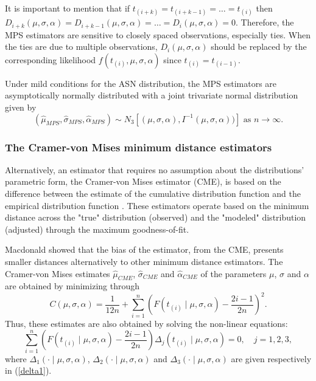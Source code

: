 \documentclass[]{interact}
\theoremstyle{plain}%
\theoremstyle{definition}
\theoremstyle{remark}
\begin{document}
It is important to mention that if $t_{(i+k)}=t_{(i+k-1)}=\ldots=t_{(i)}$ then $D_{i+k}(\mu,\sigma,\alpha)=D_{i+k-1}(\mu,\sigma,\alpha)=\ldots=D_{i}(\mu,\sigma,\alpha)=0$. Therefore, the MPS estimators are sensitive to closely spaced observations, especially ties. When the ties are due to multiple observations, $D_{i}(\mu,\sigma,\alpha)$ should be replaced by the corresponding likelihood $f(t_{(i)},\mu,\sigma,\alpha)$ since $t_{(i)}=t_{(i-1)}$. 

Under mild conditions for the ASN distribution, the MPS estimators are asymptotically normally distributed with a joint trivariate normal distribution given by
\begin{equation*}
(\hat{\mu}_{MPS},\hat{\sigma}_{MPS},\hat{\alpha}_{MPS})\sim N_3\left[(\mu,\sigma,\alpha),I^{-1}(\mu,\sigma,\alpha))\right] \mbox{ as } n \to \infty .
\end{equation*}


\subsubsection{The Cramer-von Mises minimum distance estimators}

Alternatively, an estimator that requires no assumption about the distributions' parametric form, the Cramer-von Mises estimator (CME), is based on the difference between the estimate of the cumulative distribution function and the empirical distribution
function \cite{cramer1928composition, von1928statistik}. These estimators operate based on the minimum distance across the "true" distribution (observed) and the "modeled" distribution (adjusted) through the maximum goodness-of-fit.

Macdonald \cite{macdonald1971estimation} showed that the bias of the estimator, from the CME, presents smaller distances alternatively to other minimum distance estimators. The Cramer-von Mises estimates $\hat{\mu}_{CME}$, $\hat{\sigma}_{CME}$ and $\hat{\alpha}_{CME}$ of the parameters $\mu$, $\sigma$ and $\alpha$ are obtained by minimizing through
\begin{equation}
C(\mu,\sigma,\alpha) =\frac{1}{12n}+\sum_{i=1}^{n}\left( F\left(
t_{(i)}\mid \mu,\sigma,\alpha\right) -{\frac{2i-1}{2n}}\right) ^{2}.
\end{equation}
Thus, these estimates are also obtained by solving the non-linear equations:
\begin{equation*}
\sum_{i=1}^{n}\left( F\left( t_{(i)}\mid \mu,\sigma,\alpha \right) -{\frac{2i-1}{2n}}\right) \Delta _{j}\left( t_{(i)}\mid \mu,\sigma,\alpha \right)  =0, \quad j=1,2,3,
\end{equation*}%
where $\Delta _{1}\left( \cdot \mid \mu,\sigma,\alpha \right)$, $\Delta _{2}\left( \cdot \mid \mu,\sigma,\alpha \right) $ and
$\Delta_{3}\left( \cdot \mid \mu,\sigma,\alpha \right) $ are given respectively in (\ref{delta1}).
\end{document}
